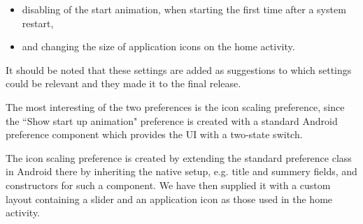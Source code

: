 \begin{itemize}
 	\item disabling of the start animation, when starting \launcher the first time after a system restart,
 	\item and changing the size of application icons on the home activity.
 \end{itemize} 
 
It should be noted that these settings are added as suggestions to which settings could be relevant and they made it to the final release.

The most interesting of the two preferences is the icon scaling preference, since the ``Show start up animation" preference is created with a standard Android preference component which provides the UI with a two-state switch.

The icon scaling preference is created by extending the standard preference class in Android there by inheriting the native setup, e.g. title and summery fields, and constructors for such a component. We have then supplied it with a custom layout containing a slider and an application icon as those used in the home activity.